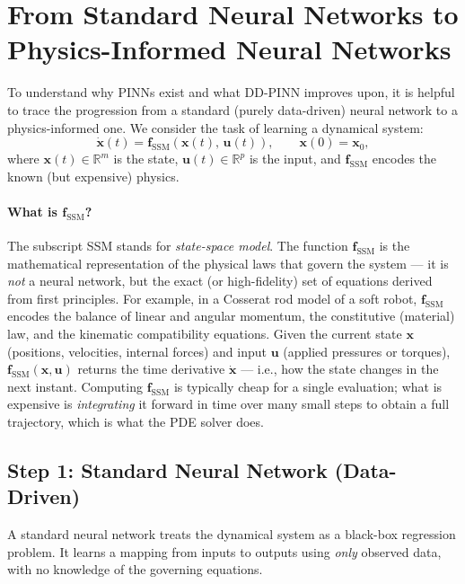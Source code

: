 \documentclass[11pt]{article}
\newcommand{\R}{\mathbb{R}}
\newcommand{\uvec}{\bm{u}}
\newcommand{\xvec}{\bm{x}}
\newcommand{\fssm}{\bm{f}_{\mathrm{SSM}}}
\begin{document}
\section{From Standard Neural Networks to Physics-Informed Neural Networks}
\label{sec:nn-vs-pinn}

To understand why PINNs exist and what DD-PINN improves upon, it is helpful to trace the progression from a standard (purely data-driven) neural network to a physics-informed one. We consider the task of learning a dynamical system:
\begin{equation}
    \dot{\xvec}(t) = \fssm(\xvec(t),\, \uvec(t)), \qquad \xvec(0) = \xvec_0,
    \label{eq:ssm}
\end{equation}
where $\xvec(t) \in \R^m$ is the state, $\uvec(t) \in \R^p$ is the input, and $\fssm$ encodes the known (but expensive) physics.

\paragraph{What is $\fssm$?} The subscript SSM stands for \emph{state-space model}. The function $\fssm$ is the mathematical representation of the physical laws that govern the system --- it is \emph{not} a neural network, but the exact (or high-fidelity) set of equations derived from first principles. For example, in a Cosserat rod model of a soft robot, $\fssm$ encodes the balance of linear and angular momentum, the constitutive (material) law, and the kinematic compatibility equations. Given the current state $\xvec$ (positions, velocities, internal forces) and input $\uvec$ (applied pressures or torques), $\fssm(\xvec, \uvec)$ returns the time derivative $\dot{\xvec}$ --- i.e., how the state changes in the next instant. Computing $\fssm$ is typically cheap for a single evaluation; what is expensive is \emph{integrating} it forward in time over many small steps to obtain a full trajectory, which is what the PDE solver does.

\subsection{Step 1: Standard Neural Network (Data-Driven)}

A standard neural network treats the dynamical system as a black-box regression problem. It learns a mapping from inputs to outputs using \emph{only} observed data, with no knowledge of the governing equations.
\end{document}
